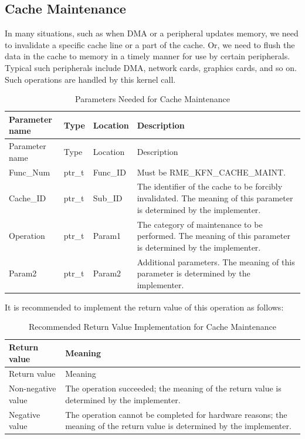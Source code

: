 \subsection{Cache Maintenance}\label{subsec:8-cache-maintenance}

In many situations, such as when DMA or a peripheral updates memory, we need to invalidate a specific cache line or a part of the cache. Or, we need to flush the data in the cache to memory in a timely manner for use by certain peripherals. Typical such peripherals include DMA, network cards, graphics cards, and so on. Such operations are handled by this kernel call.

\begin{xltabular}{\textwidth}{@{}>{\hsize\raggedright\arraybackslash}X>{\hsize\raggedright\arraybackslash}X>{\hsize\raggedright\arraybackslash}X>{\hsize\raggedright\arraybackslash}X@{}}
\caption{Parameters Needed for Cache Maintenance}\label{tab:8-29-cache-maintenance-parameters}\\
\toprule
Parameter name & Type & Location & Description\tabularnewline
\endfirsthead
\toprule
Parameter name & Type & Location & Description\tabularnewline
\midrule
\endhead
\bottomrule
\endlastfoot
Func\_Num & ptr\_t & Func\_ID & Must be RME\_KFN\_CACHE\_MAINT.\tabularnewline
Cache\_ID & ptr\_t & Sub\_ID &
The identifier of the cache to be forcibly invalidated. The meaning of this parameter is determined by the implementer.\tabularnewline
Operation & ptr\_t & Param1 &
The category of maintenance to be performed. The meaning of this parameter is determined by the implementer.\tabularnewline
Param2 & ptr\_t & Param2 &
Additional parameters. The meaning of this parameter is determined by the implementer.\tabularnewline
\end{xltabular}
\nopagebreak[4]

It is recommended to implement the return value of this operation as follows:

\begin{xltabular}{\textwidth}{@{}>{\hsize\raggedright\arraybackslash}X>{\hsize\raggedright\arraybackslash}X@{}}
\caption{Recommended Return Value Implementation for Cache Maintenance}\label{tab:8-30-cache-maintenance-suggested-return-values}\\
\toprule
Return value & Meaning\tabularnewline
\endfirsthead
\toprule
Return value & Meaning\tabularnewline
\midrule
\endhead
\bottomrule
\endlastfoot
    Non-negative value & The operation succeeded; the meaning of the return value is determined by the implementer.\tabularnewline
    Negative value & The operation cannot be completed for hardware reasons; the meaning of the return value is determined by the implementer.\tabularnewline
\end{xltabular}
\nopagebreak[4]

